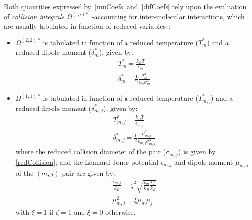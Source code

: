 Both quantities expressed by~\ref{muCoefs} and~\ref{difCoefs} rely upon the evaluation of \emph{collision integrals} $\Omega^{(\cdot,\cdot)*}$ -accounting for inter-molecular interactions, which are usually tabulated in function of reduced variables~\cite{Monchick:1961}:
\begin{itemize}
\item $\Omega^{(2,2)*}$ is tabulated in function of a reduced temperature ($T^*_m $) and a reduced dipole moment ($\delta^*_m$), given by:
\begin{eqnarray}
T^*_m = \frac{k_BT}{\epsilon_m}
\\
\delta^*_m = \frac{1}{2} \frac{\mu^2_m}{\epsilon_m \sigma^3_m}
\end{eqnarray}
\item $\Omega^{(1,1)*}$ is tabulated in function of a reduced temperature ($T^*_{m,j} $) and a reduced dipole moment ($\delta^*_{m,j}$), given by:
\begin{eqnarray}
T^*_{m,j} = \frac{k_BT}{\epsilon_{m,j}}
\\
\delta^*_{m,j} = \frac{1}{2} \frac{\mu^2_{m,j}}{\epsilon_{m,j} \sigma^3_{m,j}}
\end{eqnarray}
where the reduced collision diameter of the pair ($\sigma_{m,j}$) is given by \ref{redCollision}; and the Lennard-Jones potential $\epsilon_{m,j}$ and dipole moment $\mu_{m,j}$ of the $(m,j)$ pair are given by:
\begin{eqnarray}
\frac{\epsilon_{m,j}}{k_B} = \zeta^2 \sqrt{\frac{\epsilon_m}{k_B} \frac{\epsilon_j}{k_B}}
\\
\mu^2_{m,j} = \xi \mu_m \mu_j 
\end{eqnarray}
with $\xi = 1$ if $\zeta = 1$ and $\xi = 0$ otherwise.
\end{itemize}

